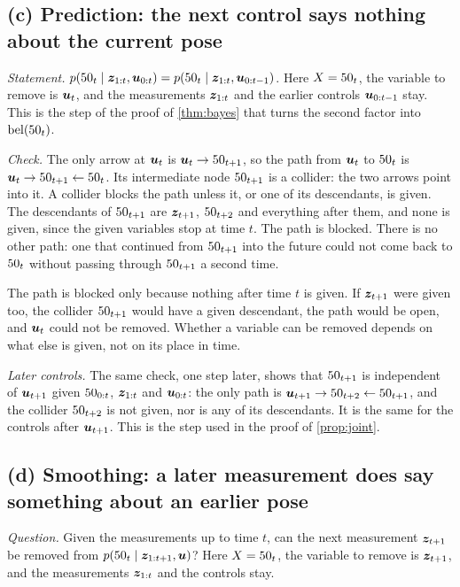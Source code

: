 \subsection*{(c) Prediction: the next control says nothing about the
current pose}

\emph{Statement.}
$p(50_t\mid\bm{z}_{1:t},\bm{u}_{0:t})=p(50_t\mid\bm{z}_{1:t},\bm{u}_{0:t-1})$. Here
$X=50_t$, the variable to remove is $\bm{u}_t$, and the measurements
$\bm{z}_{1:t}$ and the earlier controls $\bm{u}_{0:t-1}$ stay. This is the step
of the proof of \cref{thm:bayes} that turns the second factor into
$\operatorname{bel}(50_t)$.

\begin{center}

\end{center}

\emph{Check.} The only arrow at $\bm{u}_t$ is $\bm{u}_t\rightarrow50_{t+1}$, so
the path from $\bm{u}_t$ to $50_t$ is
$\bm{u}_t\rightarrow50_{t+1}\leftarrow50_t$. Its intermediate node
$50_{t+1}$ is a collider: the two arrows point into it. A collider blocks
the path unless it, or one of its descendants, is given. The descendants
of $50_{t+1}$ are $\bm{z}_{t+1}$, $50_{t+2}$ and everything after them, and
none is given, since the given variables stop at time $t$. The path is
blocked. There is no other path: one that continued from $50_{t+1}$ into
the future could not come back to $50_t$ without passing through
$50_{t+1}$ a second time.

The path is blocked only because nothing after time $t$ is given. If
$\bm{z}_{t+1}$ were given too, the collider $50_{t+1}$ would have a given
descendant, the path would be open, and $\bm{u}_t$ could not be removed.
Whether a variable can be removed depends on what else is given, not on
its place in time.

\emph{Later controls.} The same check, one step later, shows that
$50_{t+1}$ is independent of $\bm{u}_{t+1}$ given $50_{0:t}$, $\bm{z}_{1:t}$ and
$\bm{u}_{0:t}$: the only path is
$\bm{u}_{t+1}\rightarrow50_{t+2}\leftarrow50_{t+1}$, and the collider
$50_{t+2}$ is not given, nor is any of its descendants. It is the same
for the controls after $\bm{u}_{t+1}$. This is the step used in the proof of
\cref{prop:joint}.

\subsection*{(d) Smoothing: a later measurement does say something about
an earlier pose}

\emph{Question.} Given the measurements up to time $t$, can the next
measurement $\bm{z}_{t+1}$ be removed from $p(50_t\mid\bm{z}_{1:t+1},\bm{u})$? Here
$X=50_t$, the variable to remove is $\bm{z}_{t+1}$, and the measurements
$\bm{z}_{1:t}$ and the controls stay.

